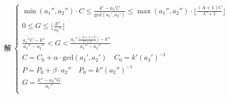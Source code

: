 \documentclass[preview]{standalone}
\begin{document}
\begin{align*}
\text{解}~\begin{cases}\min (a_1'', a_2'') \cdot C \leq \frac{k' - a_3' C}{\mathrm{gcd}(a_1', a_2')} \leq \max (a_1'', a_2'') \cdot \lfloor \frac{(A + 1)C}{C + 1} \rfloor \\0 \leq G \leq \lfloor \frac{k''}{a_2''} \rfloor \\\frac{a_1'' C - k''}{a_1'' - a_2''} < G < \frac{a_1'' \frac{(A + 1)C}{C + 1} \rfloor - k''}{a_1'' - a_2''} \\C = C_0 + \alpha \cdot \mathrm{gcd}(a_1', a_2') \quad C_0 = k' (a_3')^{-1} \\P = P_0 + \beta \cdot a_2'' \quad P_0 = k'' (a_2'')^{-1} \\G = \frac{k'' - a_2'' G}{a_1''} \\\end{cases}
\end{align*}
\end{document}

